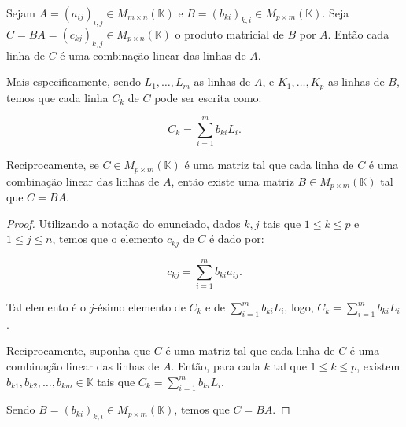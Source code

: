 \begin{proposition}
    Sejam $A=(a_{ij})_{i, j}\in M_{m \times n}(\mathbb K)$ e $B=(b_{ki})_{k, i}\in M_{p \times m}(\mathbb K)$.
    Seja $C=BA=(c_{kj})_{k,j}\in M_{p \times n}(\mathbb K)$ o produto matricial de $B$ por $A$.
    Então cada linha de $C$ é uma combinação linear das linhas de $A$.

    Mais especificamente, sendo $L_1, \dots, L_m$ as linhas de $A$, e $K_1, \dots, K_p$ as linhas de $B$, temos que cada linha $C_k$ de $C$ pode ser escrita como:

    \begin{equation*}
        C_k = \sum_{i=1}^m b_{ki} L_i.
    \end{equation*}

    Reciprocamente, se $C \in M_{p \times m}(\mathbb K)$ é uma matriz tal que cada linha de $C$ é uma combinação linear das linhas de $A$, então existe uma matriz $B\in M_{p \times m}(\mathbb K)$ tal que $C=BA$.
\end{proposition}
\begin{proof}
    Utilizando a notação do enunciado, dados $k, j$ tais que $1\leq k \leq p$ e $1\leq j \leq n$, temos que o elemento $c_{kj}$ de $C$ é dado por:

    \begin{equation*}
        c_{kj} = \sum_{i=1}^m b_{ki} a_{ij}.
    \end{equation*}

    Tal elemento é o $j$-ésimo elemento de $C_k$ e de $\sum_{i=1}^m b_{ki} L_i$, logo, $C_k = \sum_{i=1}^m b_{ki} L_i$.

    Reciprocamente, suponha que $C$ é uma matriz tal que cada linha de $C$ é uma combinação linear das linhas de $A$. Então, para cada $k$ tal que $1\leq k \leq p$, existem $b_{k1}, b_{k2}, \ldots, b_{km}\in \mathbb K$ tais que $C_k = \sum_{i=1}^m b_{ki} L_i$.

    Sendo $B=(b_{ki})_{k,i}\in M_{p \times m}(\mathbb K)$, temos que $C=BA$.
\end{proof}

